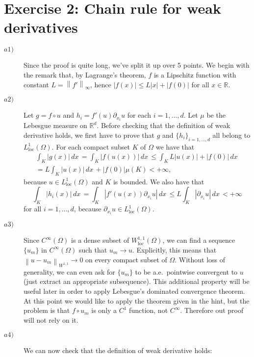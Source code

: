 \documentclass[a4paper]{article}
\newcommand{\abs}[1]{\left\lvert#1\right\rvert}
\newcommand{\dx}{\, dx \,}
\newcommand{\loneloc}{L^1_{\text{loc}}(\Omega)}
\newcommand{\norm}[1]{\left\lVert#1\right\rVert}
\newcommand{\norminf}[1]{\left\lVert#1\right\rVert_\infty}
\newcommand{\R}{\mathbb{R}}
\begin{document}
\section*{Exercise 2: Chain rule for weak derivatives}
\begin{description}
\item[$a1)$] Since the proof is quite long, we've split it up over 5 points.
	We begin with the remark that, by Lagrange's theorem,
	$f$ is a Lipschitz function with constant $L = \norminf{f'}$,
	hence $\abs{f(x)} \leq L \abs{x} + \abs{f(0)}$ for all $x \in \R$.
\item[$a2)$] Let $g = f \circ u$ and $h_i = f'(u) \partial_{x_i} u$
	for each $i = 1,\dots,d$. Let $\mu$ be the Lebesgue measure on $\R^d$.
	Before checking that the definition of weak derivative
	holds, we first have to prove that $g$ and $\{h_i\}_{i=1,\dots,d}$ all
	belong to $\loneloc$.
	For each compact subset $K$ of $\Omega$ we have that
	\begin{multline*}
	\int_K \abs{g(x)} \dx
	= \int_K \abs{f(u(x))} \dx
	\leq \int_K L \abs{u(x)} + \abs{f(0)} \dx \\
	= L \int_K \abs{u(x)} \dx + \abs{f(0)} \mu(K)
	< +\infty,
	\end{multline*}
	because $u \in \loneloc$ and $K$ is bounded. We also have that
	\begin{equation*}
	\int_K \abs{h_i(x)} \dx
	= \int_K \abs{f'(u(x)) \partial_{x_i}u} \dx
	\leq L \int_K \abs{\partial_{x_i}u} \dx
	< +\infty
	\end{equation*}
	for all $i = 1,\dots,d$, because $\partial_{x_i}u \in \loneloc$.
\item[$a3)$] Since $C^\infty(\Omega)$ is a dense subset of
	$W^{1,1}_\text{loc}(\Omega)$, we can find a sequence
	$\{u_m\}$ in $C^\infty(\Omega)$ such that $u_m \to u$.
	Explicitly, this means that $\norm{u - u_m}_{W^{1,1}} \to 0$
	on every compact subset of $\Omega$.
	Without loss of generality, we can even ask for $\{u_m\}$ to be
	a.e.\ pointwise convergent to $u$ (just extract an appropriate subsequence).
	This additional property will be useful later in order to apply
	Lebesgue's dominated convergence theorem.
	At this point we would like to apply the theorem given in the hint,
	but the problem is that $f \circ u_m$ is only a $C^1$ function,
	not $C^\infty$. Therefore out proof will not rely on it.
\item[$a4)$] We can now check that the definition of weak derivative holds:
	\begin{gather*}

\end{gather*}
\end{description}
\end{document}

